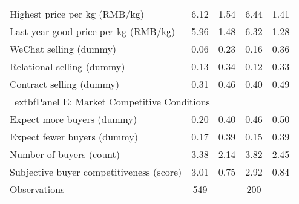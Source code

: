 \begin{table}[htbp]
\begin{tabular}{lcccc}
Highest price per kg (RMB/kg) & 6.12 & 1.54 & 6.44 & 1.41 \\ 
Last year good price per kg (RMB/kg) & 5.96 & 1.48 & 6.32 & 1.28 \\ 
WeChat selling (dummy) & 0.06 & 0.23 & 0.16 & 0.36 \\ 
Relational selling (dummy) & 0.13 & 0.34 & 0.12 & 0.33 \\ 
Contract selling (dummy) & 0.31 & 0.46 & 0.40 & 0.49 \\ 
\hline
\multicolumn{5}{l}{\	extbf{Panel E: Market Competitive Conditions}} \\

Expect more buyers (dummy) & 0.20 & 0.40 & 0.46 & 0.50 \\ 
Expect fewer buyers (dummy) & 0.17 & 0.39 & 0.15 & 0.39 \\ 
Number of buyers (count) & 3.38 & 2.14 & 3.82 & 2.45 \\ 
Subjective buyer competitiveness (score) & 3.01 & 0.75 & 2.92 & 0.84 \\ 
\hline
Observations & 549 & - & 200 & - \\
\hline
\end{tabular}
\end{table}
